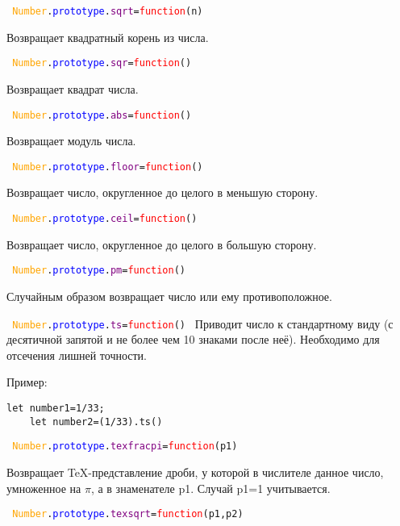 \texttt{
	\textcolor{Orange}{Number}.\textcolor{Blue}{prototype}.\textcolor{Purple}{sqrt}=\textcolor{Red}{function}(n)
}

Возвращает квадратный корень из числа.

\texttt{
	\textcolor{Orange}{Number}.\textcolor{Blue}{prototype}.\textcolor{Purple}{sqr}=\textcolor{Red}{function}()
}

Возвращает квадрат числа.

\texttt{
	\textcolor{Orange}{Number}.\textcolor{Blue}{prototype}.\textcolor{Purple}{abs}=\textcolor{Red}{function}()
}

Возвращает модуль числа.

\texttt{
	\textcolor{Orange}{Number}.\textcolor{Blue}{prototype}.\textcolor{Purple}{floor}=\textcolor{Red}{function}()
}

Возвращает число, округленное до целого в меньшую сторону.

\texttt{
	\textcolor{Orange}{Number}.\textcolor{Blue}{prototype}.\textcolor{Purple}{ceil}=\textcolor{Red}{function}()
}

Возвращает число, округленное до целого в большую сторону.

\texttt{
	\textcolor{Orange}{Number}.\textcolor{Blue}{prototype}.\textcolor{Purple}{pm}=\textcolor{Red}{function}()
}

Случайным образом возвращает число или ему противоположное.

\texttt{
	\textcolor{Orange}{Number}.\textcolor{Blue}{prototype}.\textcolor{Purple}{ts}=\textcolor{Red}{function}()
}
Приводит число к стандартному виду (с десятичной запятой и не более чем 10 знаками после неё).
Необходимо для отсечения лишней точности.

Пример:
\begin{lstlisting}[frame=none]
	let number1=1/33;
	let number2=(1/33).ts()
\end{lstlisting}

	\vspace{\baselineskip}
\texttt{
	\textcolor{Orange}{Number}.\textcolor{Blue}{prototype}.\textcolor{Purple}{texfracpi}=\textcolor{Red}{function}(p1)
}

Возвращает TeX-представление дроби, у которой в числителе данное число, умноженное на $\pi$, а в знаменателе p1.
Случай p1=1 учитывается.

\texttt{
	\textcolor{Orange}{Number}.\textcolor{Blue}{prototype}.\textcolor{Purple}{texsqrt}=\textcolor{Red}{function}(p1,p2)
}

